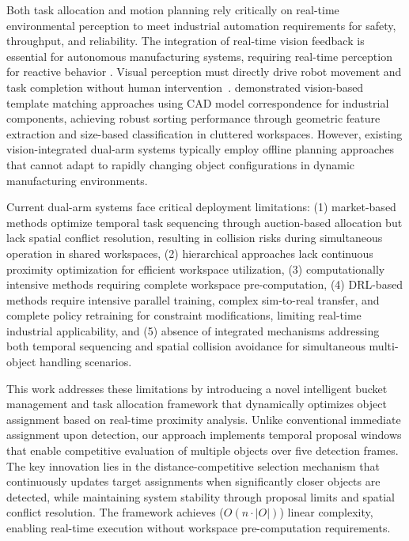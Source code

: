 \documentclass[pdflatex,sn-mathphys-num]{sn-jnl}%
\theoremstyle{thmstyleone}%
\theoremstyle{thmstylethree}%
\begin{document}
Both task allocation and motion planning rely critically on real-time environmental perception to meet industrial automation requirements for safety, throughput, and reliability. The integration of real-time vision feedback is essential for autonomous manufacturing systems, requiring real-time perception for reactive behavior \cite{santos2024}. Visual perception must directly drive robot movement and task completion without human intervention~\cite{vision_1}. \cite{vision_2} demonstrated vision-based template matching approaches using CAD model correspondence for industrial components, achieving robust sorting performance through geometric feature extraction and size-based classification in cluttered workspaces. However, existing vision-integrated dual-arm systems typically employ offline planning approaches that cannot adapt to rapidly changing object configurations in dynamic manufacturing environments.

Current dual-arm systems face critical deployment limitations: (1) market-based methods optimize temporal task sequencing through auction-based allocation but lack spatial conflict resolution, resulting in collision risks during simultaneous operation in shared workspaces, (2) hierarchical approaches lack continuous proximity optimization for efficient workspace utilization, (3) computationally intensive methods requiring complete workspace pre-computation, (4) DRL-based methods require intensive parallel training, complex sim-to-real transfer, and complete policy retraining for constraint modifications, limiting real-time industrial applicability, and (5) absence of integrated mechanisms addressing both temporal sequencing and spatial collision avoidance for simultaneous multi-object handling scenarios.

This work addresses these limitations by introducing a novel intelligent bucket management and task allocation framework that dynamically optimizes object assignment based on real-time proximity analysis. Unlike conventional immediate assignment upon detection, our approach implements temporal proposal windows that enable competitive evaluation of multiple objects over five detection frames. The key innovation lies in the distance-competitive selection mechanism that continuously updates target assignments when significantly closer objects are detected, while maintaining system stability through proposal limits and spatial conflict resolution. The framework achieves  ($O(n\cdot|O|)$) linear complexity, enabling real-time execution without workspace pre-computation requirements.
\end{document}
